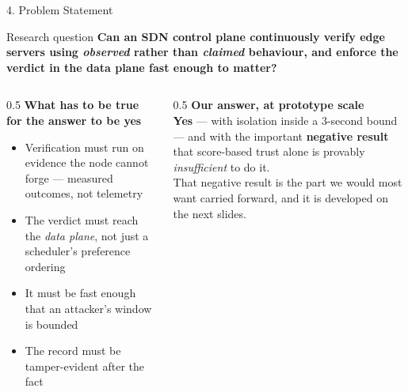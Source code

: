 \documentclass[aspectratio=169, 11pt]{beamer}
\begin{document}
\begin{frame}{4. Problem Statement}
    \vspace{4pt}
    \begin{block}{\footnotesize Research question}
      \normalsize
      \centering
      \textbf{Can an SDN control plane continuously verify edge servers using
      \emph{observed} rather than \emph{claimed} behaviour, and enforce the
      verdict in the data plane fast enough to matter?}
    \end{block}

    \vspace{8pt}
    \scriptsize
    \begin{columns}[T]
      \begin{column}{0.5\textwidth}
        \textbf{What has to be true for the answer to be yes}
        \begin{itemize}\itemsep2pt
          \item Verification must run on evidence the node cannot forge ---
                measured outcomes, not telemetry
          \item The verdict must reach the \emph{data plane}, not just a
                scheduler's preference ordering
          \item It must be fast enough that an attacker's window is bounded
          \item The record must be tamper-evident after the fact
        \end{itemize}
      \end{column}
      \begin{column}{0.5\textwidth}
        \textbf{Our answer, at prototype scale}\\[3pt]
        \textbf{Yes} --- with isolation inside a 3-second bound --- and with the
        important \textbf{negative result} that score-based trust alone is
        provably \emph{insufficient} to do it.\\[5pt]
        That negative result is the part we would most want carried forward,
        and it is developed on the next slides.
      \end{column}
    \end{columns}
\end{frame}
\end{document}
